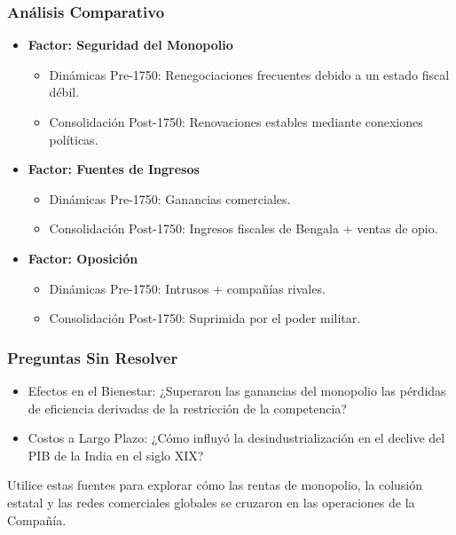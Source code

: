 \documentclass[a4paper,12pt]{article}
\begin{document}
\subsubsection*{Análisis Comparativo}

\begin{itemize}
    \item \textbf{Factor: Seguridad del Monopolio}
    \begin{itemize}
        \item Dinámicas Pre-1750: Renegociaciones frecuentes debido a un estado fiscal débil\cite{ref1,ref4}.
        \item Consolidación Post-1750: Renovaciones estables mediante conexiones políticas\cite{ref1,ref6}.
    \end{itemize}
    \item \textbf{Factor: Fuentes de Ingresos}
    \begin{itemize}
        \item Dinámicas Pre-1750: Ganancias comerciales.
        \item Consolidación Post-1750: Ingresos fiscales de Bengala + ventas de opio\cite{ref6,ref7}.
    \end{itemize}
    \item \textbf{Factor: Oposición}
    \begin{itemize}
        \item Dinámicas Pre-1750: Intrusos + compañías rivales\cite{ref4,ref6}.
        \item Consolidación Post-1750: Suprimida por el poder militar\cite{ref5,ref8}.
    \end{itemize}
\end{itemize}

\subsubsection*{Preguntas Sin Resolver}

\begin{itemize}
    \item Efectos en el Bienestar: ¿Superaron las ganancias del monopolio las pérdidas de eficiencia derivadas de la restricción de la competencia?\cite{ref4}
    \item Costos a Largo Plazo: ¿Cómo influyó la desindustrialización en el declive del PIB de la India en el siglo XIX?\cite{ref2,ref7}
\end{itemize}

Utilice estas fuentes para explorar cómo las rentas de monopolio, la colusión estatal y las redes comerciales globales se cruzaron en las operaciones de la Compañía.
\end{document}
